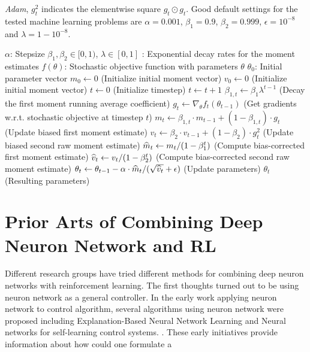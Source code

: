 \documentclass[officiallayout]{tktla}
\begin{document}
\begin{algorithm}[ht]
\caption{\emph{Adam}, $g^2_t$ indicates the elementwise square $g_t \odot g_t$. Good default settings for the tested machine learning problems are $\alpha=0.001$, $\beta_1=0.9$, $\beta_2=0.999$, $\epsilon = 10^{-8}$ and $\lambda = 1-10^{-8}$.}
\label{algo:adam}
\begin{algorithmic}
\REQUIRE $\alpha$: Stepsize
\REQUIRE $\beta_1,\beta_2\in [0,1)$, $\lambda\in[0,1]$ : Exponential decay rates for the moment estimates
\REQUIRE $f(\theta)$: Stochastic objective function with parameters $\theta$
\REQUIRE $\theta_0$: Initial parameter vector
\STATE $m_0 \gets 0$ (Initialize initial  moment vector)
\STATE $v_0 \gets 0$ (Initialize initial  moment vector)
\STATE $t \gets 0$ (Initialize timestep)
\STATE $t \gets t + 1$
\STATE $\beta_{1,t} \gets \beta_1\lambda^{t-1}$ (Decay the first moment running average coefficient)
\STATE $g_t \gets \nabla_{\theta} f_t(\theta_{t-1})$ (Get gradients w.r.t. stochastic objective at timestep $t$)
\STATE $m_t \gets \beta_{1,t} \cdot m_{t-1} + (1-\beta_{1,t}) \cdot g_t$ (Update biased first moment estimate)
\STATE $v_t \gets \beta_2 \cdot v_{t-1} + (1-\beta_2) \cdot g^2_t$ (Update biased second raw moment estimate)
\STATE $\widehat{m}_t \gets m_t / (1-\beta_1^t)$ (Compute bias-corrected first moment estimate)
\STATE $\widehat{v}_t \gets v_t / (1-\beta_2^t)$ (Compute bias-corrected second raw moment estimate)
\STATE $\theta_t \gets \theta_{t-1} - \alpha \cdot \widehat{m}_t / (\sqrt{\widehat{v}_t} + \epsilon)$ (Update parameters)
\ENDWHILE
\RETURN $\theta_t$ (Resulting parameters)
\end{algorithmic}
\vspace{-0.05in}
\end{algorithm}

\chapter{Prior Arts of Combining Deep Neuron Network and RL}
Different research groups have tried different methods for combining deep neuron networks with reinforcement learning. The first thoughts turned out to be using neuron network as a general controller. In the early work applying neuron network to control algorithm, several algorithms using neuron network were proposed including Explanation-Based Neural Network Learning\cite{thrun1996explanation} and Neural networks for self-learning control systems. \cite{nguyen1990neural}. These early initiatives provide information about how could one formulate a 
\end{document}
